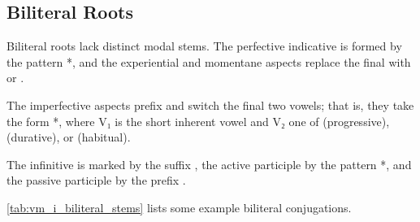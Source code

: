 \documentclass[grammar]{subfiles}
\begin{document}
\subsection{Biliteral Roots}
\label{ssec:vm_i_biliteral}

Biliteral roots lack distinct modal stems.  The perfective indicative is formed
by the pattern *, and the experiential and momentane aspects replace
the final  with  or .

The imperfective aspects prefix  and switch the final two vowels; that
is, they take the form *, where V₁ is the short inherent vowel and
V₂ one of  (progressive),  (durative), or  (habitual).

The infinitive is marked by the suffix , the active participle by the
pattern *, and the passive participle by the prefix .  

\cref{tab:vm_i_biliteral_stems} lists some example biliteral conjugations. 

\begin{table}[h!]\small\capstart
  \centering
  \\
  \caption{Pattern I biliteral stems \label{tab:vm_i_biliteral_stems}}
\end{table}
\end{document}
